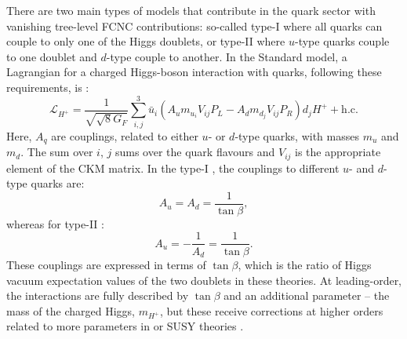There are two main types of \TwoHDM models that contribute in the quark sector with vanishing tree-level FCNC contributions:
so-called type-I \TwoHDM where all quarks can couple to only one of the Higgs doublets, or
type-II \TwoHDM where $u$-type quarks couple to one doublet and $d$-type couple to another.
In the Standard model, a Lagrangian for a charged Higgs-boson interaction with quarks, following these requirements, is \cite{Hermann:2012fc}:
\begin{equation}
    \mathcal{L}_{H^+} = \frac{1}{\sqrt{\sqrt8G_F}} \sum_{i,j}^3 \bar{u}_i (A_u m_{u_i}V_{ij}P_L - A_d m_{d_j}V_{ij}P_R)d_jH^+ + \mathrm{h.c}.
\end{equation}
Here, $A_q$ are couplings, related to either $u$- or $d$-type quarks, with masses $m_u$ and $m_d$.
The sum over $i$, $j$ sums over the quark flavours and $V_{ij}$ is the appropriate element of the CKM matrix.
In the type-I \TwoHDM, the couplings to different $u$- and $d$-type quarks are:
\begin{equation}\label{eq:type1_hdm_couplings}
A_u = A_d = \frac{1}{\tan\beta},
\end{equation}
whereas for type-II \TwoHDM:
\begin{equation}\label{eq:type2_hdm_couplings}
    A_u = - \frac{1}{A_d} = \frac{1}{\tan\beta}.
\end{equation}
These couplings are expressed in terms of $\tan\beta$, which is the ratio of Higgs vacuum expectation values of the two doublets in these theories.
At leading-order, the interactions are fully described by $\tan\beta$ and an additional parameter -- the mass of the charged Higgs, $m_{H^+}$, but these receive corrections at higher orders related to more parameters in \TwoHDM or SUSY theories \cite{Feng:1996xv}.

